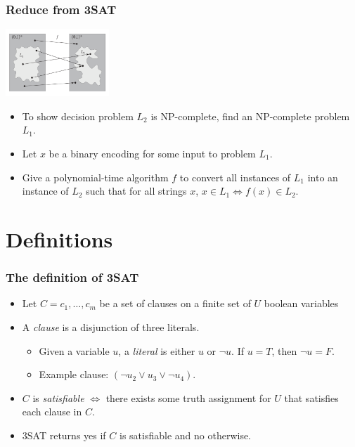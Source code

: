 \documentclass{beamer}
\begin{document}
\begin{frame}
\frametitle{Reduce from 3SAT}
\begin{centering}
\includegraphics[height = 72pt]{reduction}
\end{centering}
\begin{itemize}
  \item To show decision problem $L_2$ is NP-complete, find an NP-complete problem $L_1$.
  \item Let $x$ be a binary encoding for some input to problem $L_1$.
  \item Give a polynomial-time algorithm $f$ to convert all instances of $L_1$ into an instance of $L_2$ such that for all strings $x$, $x \in L_1 \Leftrightarrow f(x) \in L_2$.
\end{itemize}
\end{frame}

\section{Definitions}

\begin{frame}
\frametitle{The definition of 3SAT}
\begin{itemize}
  \item Let $C = {c_1, \ldots, c_m}$ be a set of clauses on a finite set of $U$ boolean variables 
  \item A \emph{clause} is a disjunction of three literals.
  \begin{itemize}
    \item Given a variable $u$, a \emph{literal} is either $u$ or $\neg u$. If $u = T$, then $\neg u = F$.
    \item Example clause: $(\neg u_2 \lor u_3 \lor \neg u_4)$.
  \end{itemize}
  \item $C$ is \emph{satisfiable} $\Leftrightarrow$ there exists some truth assignment for $U$ that satisfies each clause in $C$.
  \item 3SAT returns {\sc yes} if $C$ is satisfiable and {\sc no} otherwise.
\end{itemize}
\end{frame}
\end{document}
